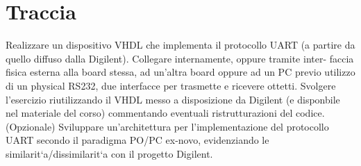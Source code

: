 %

\section{Traccia}

Realizzare un dispositivo VHDL che implementa il protocollo UART (a
partire da quello diffuso dalla Digilent). Collegare internamente,
oppure tramite inter- faccia fisica esterna alla board stessa, ad
un\textquoteright altra board oppure ad un PC previo utilizzo di un
physical RS232, due interfacce per trasmette e ricevere ottetti. Svolgere
l\textquoteright esercizio riutilizzando il VHDL messo a disposizione
da Digilent (e disponbile nel materiale del corso) commentando eventuali
ristrutturazioni del codice. (Opzionale) Sviluppare un\textquoteright architettura
per l\textquoteright implementazione del protocollo UART secondo il
paradigma PO/PC ex-novo, evidenziando le similarit`a/dissimilarit`a
con il progetto Digilent.%

